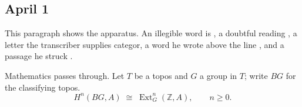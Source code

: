 \documentclass[11pt,a4paper]{article}
\begin{document}
\subsection*{April 1}

This paragraph shows the apparatus. An illegible word is \ill{}, a doubtful
reading , a letter the transcriber supplies
categor, a word he wrote above the line , and a passage
he struck .

Mathematics passes through. Let $T$ be a topos and $G$ a group in $T$; write
$BG$ for the classifying topos.
\[
  H^n(BG, A) \;\cong\; \operatorname{Ext}^n_{G}(\mathbb{Z}, A), \qquad n \geqslant 0 .
\]



\end{document}
